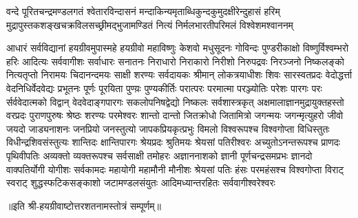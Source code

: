 
\fourlineindentedshloka
{वन्दे पूरितचन्द्रमण्डलगतं श्वेतारविन्दासनं}
{मन्दाकिन्यमृताब्धिकुन्दकुमुदक्षीरेन्दुहासं हरिम्}
{मुद्रापुस्तकशङ्खचक्रविलसच्छ्रीमद्भुजामण्डितं}
{नित्यं निर्मलभारतीपरिमलं विश्वेशमश्वाननम्}

{आधारं सर्वविद्यानां हयग्रीवमुपास्महे}
\twolineshloka
{हयग्रीवो महाविष्णुः केशवो मधुसूदनः}
{गोविन्दः पुण्डरीकाक्षो विष्णुर्विश्वम्भरो हरिः}
\twolineshloka
{आदित्यः सर्ववागीशः सर्वाधारः सनातनः}
{निराधारो निराकारो निरीशो निरुपद्रवः}
\twolineshloka
{निरञ्जनो  निष्कलङ्को नित्यतृप्तो निरामयः}
{चिदानन्दमयः साक्षी शरण्यः सर्वदायकः}
\twolineshloka
{श्रीमान् लोकत्रयाधीशः शिवः सारस्वतप्रदः}
{वेदोद्धर्त्ता वेदनिधिर्वेदवेद्यः प्रभूतनः}
\twolineshloka
{पूर्णः पूरयिता पुण्य़ः पुण्यकीर्तिः परात्परः}
{परमात्मा परञ्ज्योतिः परेशः पारगः परः}
\twolineshloka
{र्सर्ववेदात्मको विद्वान् वेदवेदाङ्गपारगः}
{सकलोपनिषद्वेद्यो निष्कलः सर्वशास्त्रकृत्}
\twolineshloka
{अक्षमालाज्ञानमुद्रायुक्तहस्तो वरप्रदः}
{पुराणपुरुषः श्रेष्ठः शरण्यः परमेश्वरः}
\twolineshloka
{शान्तो दान्तो जितक्रोधो जितामित्रो जगन्मयः}
{जगन्मृत्युहरो जीवो जयदो जाड्यनाशनः}
\twolineshloka
{जनप्रियो जनस्तुत्यो जापकप्रियकृत्प्रभुः}
{विमलो विश्वरूपश्च विश्वगोप्ता विधिस्तुतः}
\twolineshloka
{विधीन्द्रशिवसंस्तुत्यः शान्तिदः क्षान्तिपारगः}
{श्रेयप्रदः श्रुतिमयः श्रेयसां पतिरीश्वरः}
\twolineshloka
{अच्युतोऽनन्तरूपश्च प्राणदः पृथिवीपतिः}
{अव्यक्तो व्यक्तरूपश्च सर्वसाक्षी तमोहरः}
\twolineshloka
{अज्ञाननाशको ज्ञानी पूर्णचन्द्रसमप्रभः}
{ज्ञानदो वाक्पतिर्योगी योगीशः सर्वकामदः}
\twolineshloka
{महायोगी महामौनी मौनीशः श्रेयसां पतिः}
{हंसः परमहंसश्च विश्वगोप्ता विराट् स्वराट्}
\twolineshloka
{शुद्धस्फटिकसङ्काशो जटामण्डलसंयुतः}
{आदिमध्यान्तरहितः सर्ववागीश्वरेश्वरः}

॥इति श्री-हयग्रीवाष्टोत्तरशतनामस्तोत्रं सम्पूर्णम्॥
